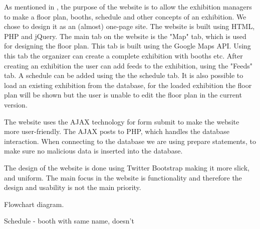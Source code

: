 As mentioned in , the purpose of the website is to allow the exhibition managers to make a floor plan, booths, schedule and other concepts of an exhibition. We chose to design it as an (almost) one-page site. 
The website is built using HTML, PHP and jQuery. The main tab on the website is the "Map" tab, which is used for designing the floor plan. This tab is built using the Google Maps API. Using this tab the organizer can create a complete exhibition with booths etc.
After creating an exhibition the user can add feeds to the exhibition, using the "Feeds" tab. A schedule can be added using the the schedule tab.
It is also possible to load an existing exhibition from the database, for the loaded exhibition the floor plan will be shown but the user is unable to edit the floor plan in the current version.

The website uses the AJAX technology for form submit to make the website more user-friendly. The AJAX posts to PHP, which handles the database interaction. When connecting to the database we are using prepare statements, to make sure no malicious data is inserted into the database.

The design of the website is done using Twitter Bootstrap making it more slick, and uniform.
The main focus in the website is functionality and therefore the design and usability is not the main priority.




Flowchart diagram. 


Schedule - booth with same name, doesn't 